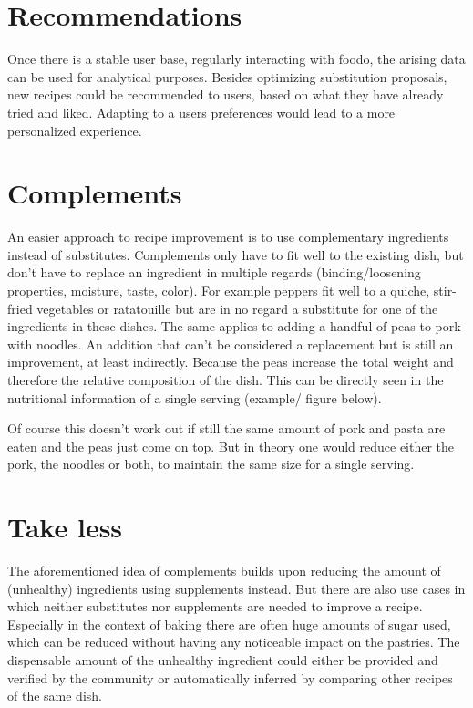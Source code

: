\section*{Recommendations}
Once there is a stable user base, regularly interacting with foodo, the arising data can be used for analytical purposes. Besides optimizing substitution proposals, new recipes could be recommended to users, based on what they have already tried and liked. Adapting to a users preferences would lead to a more personalized experience.

\section*{Complements}
An easier approach to recipe improvement is to use complementary ingredients instead of substitutes. Complements only have to fit well to the existing dish, but don't have to replace an ingredient in multiple regards (binding/loosening properties, moisture, taste, color). 
For example peppers fit well to a quiche, stir-fried vegetables or ratatouille but are in no regard a substitute for one of the ingredients in these dishes. The same applies to adding a handful of peas to pork with noodles. An addition that can’t be considered a replacement but is still an improvement, at least indirectly. Because the peas increase the total weight and therefore the relative composition of the dish. This can be directly seen in the nutritional information of a single serving (example/ figure below). 

Of course this doesn’t work out if still the same amount of pork and pasta are eaten and the peas just come on top. But in theory one would reduce either the pork, the noodles or both, to maintain the same size for a single serving.

\section*{Take less}
The aforementioned idea of complements builds upon reducing the amount of (unhealthy) ingredients using supplements instead. But there are also use cases in which neither substitutes nor supplements are needed to improve a recipe. Especially in the context of baking there are often huge amounts of sugar used, which can be reduced without having any noticeable impact on the pastries. The dispensable amount of the unhealthy ingredient could either be provided and verified by the community or automatically inferred by comparing other recipes of the same dish.

